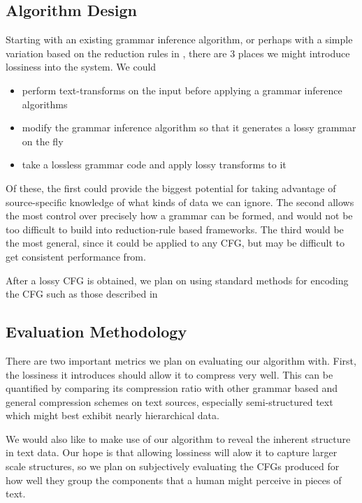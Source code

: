 \documentclass[11pt]{article}
\begin{document}
\subsection{Algorithm Design}

Starting with an existing grammar inference algorithm, or perhaps with a simple
variation based on the reduction rules in \cite{grammarcodes}, there are 3
places we might introduce lossiness into the system. We could
\begin{itemize}
  \item perform text-transforms on the input before applying a grammar
    inference algorithms
  \item modify the grammar inference algorithm so that it generates a lossy
    grammar on the fly
  \item take a lossless grammar code and apply lossy transforms to it
\end{itemize}

Of these, the first could provide the biggest potential for taking advantage of
source-specific knowledge of what kinds of data we can ignore. The second
allows the most control over precisely how a grammar can be formed, and would
not be too difficult to build into reduction-rule based frameworks. The third
would be the most general, since it could be applied to any CFG, but may be
difficult to get consistent performance from.

After a lossy CFG is obtained, we plan on using standard methods for encoding
the CFG such as those described in \cite{sequitur2}

\subsection{Evaluation Methodology}

There are two important metrics we plan on evaluating our algorithm with. First,
the lossiness it introduces should allow it to compress very well. This can be
quantified by comparing its compression ratio with other grammar based and 
general compression schemes on text sources, especially semi-structured text 
which might best exhibit nearly hierarchical data.

We would also like to make use of our algorithm to reveal the inherent 
structure in text data. Our hope is that allowing lossiness will alow it 
to capture larger scale structures, so we plan on subjectively evaluating 
the CFGs produced for how well they group the components that a human
might perceive in pieces of text.
\end{document}
